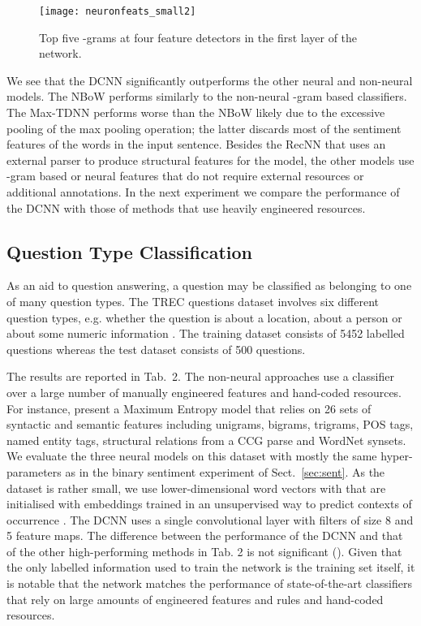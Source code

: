 \documentclass[11pt]{article}
\begin{document}
\begin{figure*}
\centering
\label{neurons}
{\texttt{[image: neuronfeats\_small2]}}
\vspace{-0.8cm}
\caption{Top five -grams at four feature detectors in the first layer of the network.}
\vspace{-0.5cm}
\end{figure*}
We see that the DCNN significantly outperforms the other neural and non-neural models. The NBoW performs similarly to the non-neural -gram based classifiers. The Max-TDNN performs worse than the NBoW likely due to the excessive pooling of the max pooling operation; the latter discards most of the sentiment features of the words in the input sentence.
Besides the RecNN that uses an external parser to produce structural features for the model, the other models use -gram based or neural features that do not require external resources or additional annotations. In the next experiment we compare the performance of the DCNN with those of methods that use heavily engineered resources.



\subsection{Question Type Classification}

As an aid to question answering, a question may be classified as belonging to one of many question types. The TREC questions dataset involves six different question types, e.g. whether the question is about a location, about a person or about some numeric information \cite{li2002learning}.  The training dataset consists of 5452 labelled questions whereas the test dataset consists of 500 questions. 

The results are reported in Tab.~2. The non-neural approaches use a classifier over a large number of manually engineered features and hand-coded resources.  For instance,  present a Maximum Entropy model that relies on 26 sets of syntactic and semantic features including unigrams, bigrams, trigrams, POS tags, named entity tags, structural relations from a CCG parse and WordNet synsets. 
We evaluate the three neural models on this dataset with mostly the same hyper-parameters as in the binary sentiment experiment of Sect.~\ref{sec:sent}. As the dataset is rather small, we use lower-dimensional word vectors with  that are initialised with embeddings trained in an unsupervised way to predict contexts of occurrence \cite{turian2010word}. The DCNN uses a single convolutional layer with filters of size 8 and 5 feature maps. The difference between the performance of the DCNN and that of the other high-performing methods in Tab. 2 is not significant (). Given that the only labelled information used to train the network is the training set itself, it is notable that the network matches the performance of state-of-the-art classifiers that rely on large amounts of engineered features and rules and hand-coded resources. 
\end{document}
